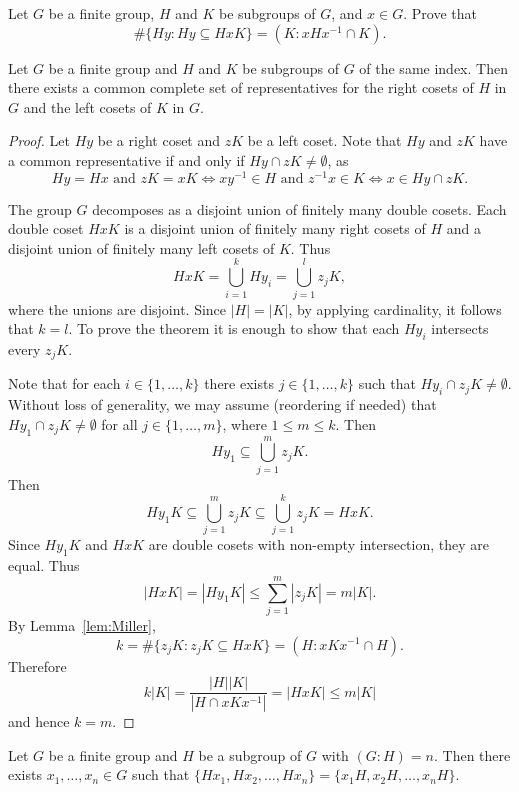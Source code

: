 \begin{exercise}
\label{xca:Miller}
    Let $G$ be a finite group, $H$ and $K$ be subgroups of $G$, and $x\in G$. Prove 
    that 
    \[
    \#\{Hy:Hy\subseteq HxK\}=(K:xHx^{-1}\cap K).
    \]
\end{exercise}

\begin{theorem}[Miller]
    Let $G$ be a finite group and $H$ and $K$ be subgroups of $G$ 
    of the same index. Then there exists a common complete set
    of representatives for the right cosets of $H$ in $G$ and the 
    left cosets of $K$ in $G$. 
\end{theorem}

\begin{proof}
    Let $Hy$ be a right coset and $zK$ be a left coset. Note that 
    $Hy$ and $zK$ have a common representative
    if and only if $Hy\cap zK\ne\emptyset$, as 
    \[
    Hy=Hx\text{ and }zK=xK
    \Longleftrightarrow 
    xy^{-1}\in H\text{ and }z^{-1}x\in K
    \Longleftrightarrow x\in Hy\cap zK.
    \]

    The group $G$ decomposes as a  
    disjoint union of finitely many double cosets. Each double coset
    $HxK$ is a disjoint union of finitely many right cosets of $H$ 
    and a disjoint union of finitely many left cosets of $K$. Thus 
    \[
    HxK=\bigcup_{i=1}^kHy_i=\bigcup_{j=1}^lz_jK, 
    \]
    where the unions are disjoint. 
    Since $|H|=|K|$, by applying cardinality, it follows that $k=l$. To prove the theorem
    it is enough to show that each $Hy_i$ intersects every $z_jK$. 
    
    Note that for each $i\in\{1,\dots,k\}$ there exists $j\in\{1,\dots,k\}$ such that
    $Hy_i\cap z_jK\ne\emptyset$. 
    Without loss of generality, we may assume (reordering if needed) that 
    $Hy_1\cap z_jK\ne\emptyset$ for all $j\in\{1,\dots,m\}$, where $1\leq m\leq k$. Then
    \[
    Hy_1\subseteq\bigcup_{j=1}^mz_jK. 
    \]
    Then
    \[
    Hy_1K\subseteq\bigcup_{j=1}^mz_jK\subseteq \bigcup_{j=1}^kz_jK=HxK.
    \]
    Since $Hy_1K$ and $HxK$ are double cosets with non-empty intersection, 
    they are equal. Thus 
    \[
    |HxK|=|Hy_1K|\leq \sum_{j=1}^m|z_jK|=m|K|.
    \]
    By Lemma~\ref{lem:Miller}, 
    \[
    k=\#\{z_jK:z_jK\subseteq HxK\}=(H:xKx^{-1}\cap H). 
    \]
    Therefore
    \[
    k|K|=\frac{|H||K|}{|H\cap xKx^{-1}|}=|HxK|\leq m|K|
    \]
    and hence $k=m$. 
\end{proof}

\begin{exercise}[Hall]
\label{xca:Hall:cosets}
    Let $G$ be a finite group and $H$ be a subgroup of $G$ with $(G:H)=n$. 
    Then there exists $x_1,\dots,x_n\in G$ such that 
    $\{Hx_1,Hx_2,\dots,Hx_n\}=\{x_1H,x_2H,\dots,x_nH\}$. 
\end{exercise}

